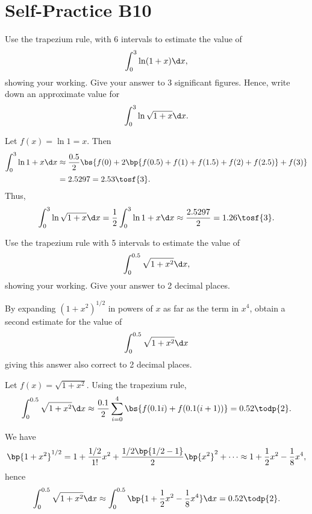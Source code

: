 \section{Self-Practice B10}

\begin{problem}
    Use the trapezium rule, with 6 intervals to estimate the value of \[\int_{0}^{3}\ln(1+x) \d x,\] showing your working. Give your answer to 3 significant figures. Hence, write down an approximate value for \[\int_{0}^{3}\ln\sqrt{1+x} \d x.\]
\end{problem}
\begin{solution}
    Let $f(x) = \ln{1 = x}$. Then
    \begin{align*}
        \int_0^3 \ln{1 + x} \d x &\approx \frac{0.5}{2}\bs{f(0) + 2\bp{f(0.5) + f(1) + f(1.5) + f(2) + f(2.5)} + f(3)}\\
        &= 2.5297 = 2.53 \tosf{3}.
    \end{align*}
    Thus, \[\int_0^3 \ln \sqrt{1 + x} \d x = \frac12 \int_0^3 \ln{1 + x} \d x \approx \frac{2.5297}2 = 1.26 \tosf{3}.\]
\end{solution}

\begin{problem}
    Use the trapezium rule with 5 intervals to estimate the value of \[\int_{0}^{0.5}\sqrt{1+x^{2}} \d x,\] showing your working. Give your answer to 2 decimal places.

    By expanding $(1+x^{2})^{1/2}$ in powers of $x$ as far as the term in $x^{4}$, obtain a second estimate for the value of \[\int_{0}^{0.5}\sqrt{1+x^{2}} \d x\] giving this answer also correct to 2 decimal places.
\end{problem}
\begin{solution}
    Let $f(x) = \sqrt{1 + x^2}$. Using the trapezium rule, \[\int_0^{0.5} \sqrt{1 + x^2} \d x \approx \frac{0.1}{2} \sum_{i = 0}^4 \bs{f(0.1i) + f(0.1(i+1))} = 0.52 \todp{2}.\]

    We have \[\bp{1 + x^2}^{1/2} = 1 + \frac{1/2}{1!}x^2 + \frac{1/2 \bp{1/2 -1}}{2} \bp{x^2}^2 + \dots \approx 1 + \frac12 x^2 - \frac18 x^4,\] hence \[\int_0^{0.5} \sqrt{1 + x^2} \d x \approx \int_0^{0.5} \bp{1 + \frac12 x^2 - \frac18 x^4} \d x = 0.52 \todp{2}.\]
\end{solution}

